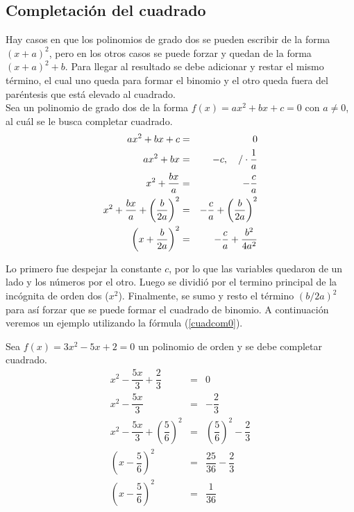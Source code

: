 \begin{appendix}
\chapter{Completación del cuadrado} \label{completarbi}

Hay casos en que los polinomios de grado dos se pueden escribir de la forma $(x+a)^{2}$, pero en los otros casos se puede forzar y quedan de la forma $(x+a)^{2}+b$. Para llegar al resultado se debe adicionar y restar el mismo término, el cual uno queda para formar el binomio y el otro queda fuera del paréntesis que está elevado al cuadrado. \\

Sea un polinomio de grado dos de la forma $f(x)=ax^{2}+bx+c=0$ con $a\neq 0$, al cuál se le busca completar cuadrado.\\

\begin{eqnarray}
ax^{2}+bx+c&=&0\\
ax^{2}+bx&=&-c, \hspace{10px} \slash \cdot \dfrac{1}{a} \\
x^{2}+\dfrac{bx}{a}&=&-\dfrac{c}{a}\\
x^{2}+\dfrac{bx}{a}+\left(\dfrac{b}{2a}\right)^{2}&=&-\dfrac{c}{a}+\left(\dfrac{b}{2a}\right)^{2}\\
\left(x+\dfrac{b}{2a}\right)^{2}&=&-\dfrac{c}{a}+\dfrac{b^{2}}{4a^{2}} \label{cuadcom0}
\end{eqnarray}

Lo primero fue despejar la constante $c$, por lo que las variables quedaron de un lado y los números por el otro. Luego se dividió por el termino principal de la incógnita de orden dos ($x^{2}$). Finalmente, se sumo y resto el término $(b/2a)^{2}$ para así forzar que se puede formar el cuadrado de binomio. A continuación veremos un ejemplo utilizando la fórmula (\ref{cuadcom0}).\\

\newpage
\begin{myexample}
Sea $f(x)=3x^{2}-5x+2=0$ un polinomio de orden y se debe completar cuadrado.
\begin{eqnarray*}
x^{2}-\dfrac{5x}{3}+\dfrac{2}{3}&=&0\\
x^{2}-\dfrac{5x}{3}&=&-\dfrac{2}{3}\\
x^{2}-\dfrac{5x}{3}+\left(\dfrac{5}{6}\right)^{2}&=&\left(\dfrac{5}{6}\right)^{2}-\dfrac{2}{3}\\
\left(x-\dfrac{5}{6}\right)^{2}&=&\dfrac{25}{36}-\dfrac{2}{3}\\
\left(x-\dfrac{5}{6}\right)^{2}&=&\dfrac{1}{36}\\
\end{eqnarray*}
\end{myexample}

\end{appendix}
